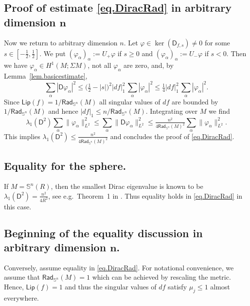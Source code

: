 \documentclass[11pt,reqno]{amsart}
\newcommand{\RadSn}{\mathsf{Rad}_{\Sn}}
\newcommand{\Lip}{\mathsf{Lip}}
\newcommand{\Sn}{\mathbb{S}^n}
\newcommand{\D}{\mathsf{D}}
\renewcommand{\phi}{\varphi}
\newcommand{\<}{\langle}
\renewcommand{\>}{\rangle}
\theoremstyle{definition}
\begin{document}
\subsection{\texorpdfstring{Proof of estimate \eqref{eq.DiracRad} in arbitrary dimension $\boldsymbol{n}$}{Proof of estimate (1) in arbitrary dimension n}}
\label{subsec.estimate}
Now we return to arbitrary dimension $n$.
Let $\phi\in\ker(\D_{f,s})\ne0$ for some $s\in[-\frac12,\frac12]$.
We put $(\phi_\alpha)_\alpha:=U_+\phi$ if $s\ge0$ and $(\phi_\alpha)_\alpha:=U_-\phi$ if $s<0$.
Then we have $\phi_\alpha\in H^1(M;\Sigma M)$, not all $\phi_\alpha$ are zero, and, by Lemma~\ref{lem.basicestimate},
\begin{equation}
\sum_\alpha |\D\phi_\alpha|^2
\le
\big(\tfrac12-|s|\big)^2|df|_1^2 \,\sum_\alpha |\phi_\alpha|^2
\le
\tfrac14 |df|_1^2 \,\sum_\alpha |\phi_\alpha|^2 .
\label{eq.lambdaRadPointwise}
\end{equation}
Since $\Lip(f)=1/\RadSn(M)$ all singular values of $df$ are bounded by $1/\RadSn(M)$ and hence $|df|_1\le n/\RadSn(M)$.
Integrating over $M$ we find
\begin{equation}
\lambda_1(\D^2)\sum_\alpha \|\phi_\alpha\|_{L^2}^2
\le
\sum_\alpha \|\D \phi_\alpha\|_{L^2}^2
\le
\tfrac{n^2}{4\RadSn(M)^2} \sum_\alpha \|\phi_\alpha\|_{L^2}^2 .
\label{eq.lambdaRad}
\end{equation}
This implies $\lambda_1(\D^2) \le \frac{n^2}{4\RadSn(M)^2}$ and concludes the proof of \eqref{eq.DiracRad}.

\subsection{Equality for the sphere.}
If $M=\Sn(R)$, then the smallest Dirac eigenvalue is known to be $\lambda_1(\D^2)=\frac{n^2}{4R^2}$, see e.g.\ Theorem~1 in \cite{B-SpaceForms}.
Thus equality holds in \eqref{eq.DiracRad} in this case.

\subsection{\texorpdfstring{Beginning of the equality discussion in arbitrary dimension $\boldsymbol{n}$.}{Beginning of the equality discussion in arbitrary dimension n}}
Conversely, assume equality in \eqref{eq.DiracRad}.
For notational convenience, we assume that $\RadSn(M)=1$ which can be achieved by rescaling the metric.
Hence, $\Lip(f)=1$ and thus the singular values of $df$ satisfy $\mu_j\le1$ almost everywhere.
\end{document}
